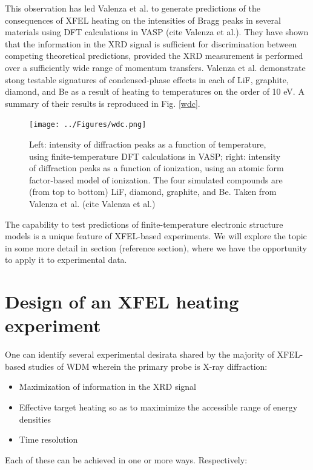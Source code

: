 \documentclass [11pt, proquest, article] {uwthesis}[2016/11/22]
\begin{document}
This observation has led Valenza et al. to generate predictions of the consequences of XFEL heating on the intensities of Bragg peaks in several materials using DFT calculations in VASP (cite Valenza et al.). They have shown that the information in the XRD signal is sufficient for discrimination between competing theoretical predictions, provided the XRD measurement is performed over a sufficiently wide range of momentum transfers. Valenza et al. demonstrate stong testable signatures of condensed-phase effects in each of LiF, graphite, diamond, and Be as a result of heating to temperatures on the order of 10 eV. A summary of their results is reproduced in Fig. \ref{wdc}.

\begin{figure}[h] 
\caption{Left: intensity of diffraction peaks as a function of temperature, using finite-temperature DFT calculations in VASP; right: intensity of diffraction peaks as a function of ionization, using an atomic form factor-based model of ionization. The four simulated compounds are (from top to bottom) LiF, diamond, graphite, and Be. Taken from Valenza et al. (cite Valenza et al.)}
\centering
\texttt{[image: ../Figures/wdc.png]}
\label{fig:wdc}
\end{figure}

The capability to test predictions of finite-temperature electronic structure models is a unique feature of XFEL-based experiments. We will explore the topic in some more detail in section (reference section), where we have the opportunity to apply it to experimental data. 

\section{Design of an XFEL heating experiment}
One can identify several experimental desirata shared by the majority of XFEL-based studies of WDM wherein the primary probe is X-ray diffraction:

\begin{itemize}
\item{Maximization of information in the XRD signal}
\item{Effective target heating so as to maximimize the accessible range of energy densities}
\item{Time resolution}
\end{itemize}

Each of these can be achieved in one or more ways. Respectively:
\end{document}
